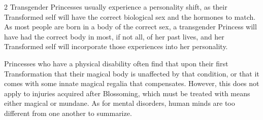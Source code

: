 \begin{multicols}{2}
Transgender Princesses usually experience a personality shift, as their Transformed self will have the correct biological sex and the hormones to match. As most people are born in a body of the correct sex, a transgender Princess will have had the correct body in most, if not all, of her past lives, and her Transformed self will incorporate those experiences into her personality. 

Princesses who have a physical disability often find that upon their first Transformation that their magical body is unaffected by that condition, or that it comes with some innate magical regalia that compensates. However, this does not apply to injuries acquired after Blossoming, which must be treated with means either magical or mundane. As for mental disorders, human minds are too different from one another to summarize. 

\end{multicols}
